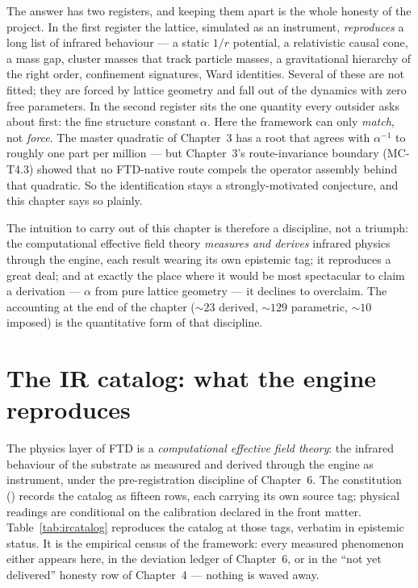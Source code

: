 The answer has two registers, and keeping them apart is the whole honesty of the
project. In the first register the lattice, simulated as an instrument,
\emph{reproduces} a long list of infrared behaviour --- a static $1/r$ potential,
a relativistic causal cone, a mass gap, cluster masses that track particle
masses, a gravitational hierarchy of the right order, confinement signatures,
Ward identities. Several of these are not fitted; they are forced by lattice
geometry and fall out of the dynamics with zero free parameters. In the second
register sits the one quantity every outsider asks about first: the fine
structure constant $\alpha$. Here the framework can only \emph{match}, not
\emph{force}. The master quadratic of Chapter~3 has a root that agrees with
$\alpha^{-1}$ to roughly one part per million --- but Chapter~3's route-invariance
boundary (MC-T4.3) showed that no FTD-native route compels the operator assembly
behind that quadratic. So the identification stays a strongly-motivated
conjecture, and this chapter says so plainly.

The intuition to carry out of this chapter is therefore a discipline, not a
triumph: the computational effective field theory \emph{measures and derives}
infrared physics through the engine, each result wearing its own epistemic tag;
it reproduces a great deal; and at exactly the place where it would be most
spectacular to claim a derivation --- $\alpha$ from pure lattice geometry --- it
declines to overclaim. The accounting at the end of the chapter
(${\sim}23$ derived, ${\sim}129$ parametric, ${\sim}10$ imposed) is the
quantitative form of that discipline.

\section{The IR catalog: what the engine reproduces}
\label{sec:ircatalog}

The physics layer of FTD is a \emph{computational effective field theory}: the
infrared behaviour of the substrate as measured and derived through the engine
as instrument, under the pre-registration discipline of Chapter~6. The
constitution () records the catalog as fifteen rows, each carrying its
own source tag; physical readings are conditional on the calibration declared in
the front matter. Table~\ref{tab:ircatalog} reproduces the catalog at those tags,
verbatim in epistemic status. It is the empirical census of the framework: every
measured phenomenon either appears here, in the deviation ledger of Chapter~6, or
in the ``not yet delivered'' honesty row of Chapter~4 --- nothing is waved away.

